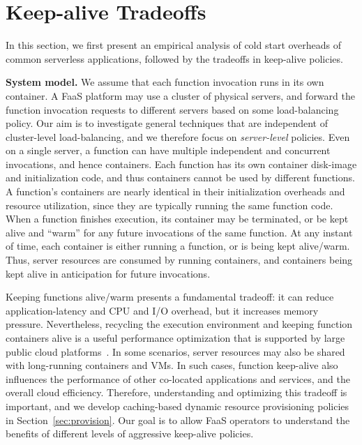 \section{Keep-alive Tradeoffs}
\label{sec:tradeoffs}

\vspace*{\subsecspace}

In this section, we first present an empirical analysis of cold start overheads of common serverless applications, followed by the tradeoffs in keep-alive policies. 

\noindent \textbf{System model.} 
We assume that each function invocation runs in its own container. 
%
A FaaS platform may use a cluster of physical servers, and forward the function invocation requests to different servers based on some load-balancing policy. 
Our aim is to investigate general techniques that are independent of cluster-level load-balancing, and we therefore focus on \emph{server-level} policies. 
Even on a single server, a function can have multiple independent and concurrent invocations, and hence containers. 
Each function has its own container disk-image and initialization code, and thus containers cannot be used by different functions. 
A function's containers are nearly identical in their initialization overheads and resource utilization, since they are typically running the same function code. 
%
When a function finishes execution, its container may be terminated, or be kept alive and ``warm'' for any future invocations of the same function. 
%
At any instant of time, each container is either running a function, or is being kept alive/warm. %
%
Thus, server resources are consumed by running containers, and containers being kept alive in anticipation for future invocations. 


Keeping functions alive/warm presents a fundamental tradeoff: it can reduce application-latency and CPU and I/O overhead, but it increases memory pressure. 
Nevertheless, recycling the execution environment and keeping function containers alive is a useful performance optimization that is supported by large public cloud platforms~\cite{goog-functions-tricks,aws-warm-predictable,azure-warmup-trigger}. 
%
In some scenarios, server resources may also be shared with long-running containers and VMs. 
In such cases, function keep-alive also influences the performance of other co-located applications and services, and the overall cloud efficiency. 
Therefore, understanding and optimizing this tradeoff is important, and we develop caching-based dynamic resource provisioning policies in Section~\ref{sec:provision}. 
Our goal is to allow FaaS operators to understand the benefits of different levels of aggressive keep-alive policies. 


